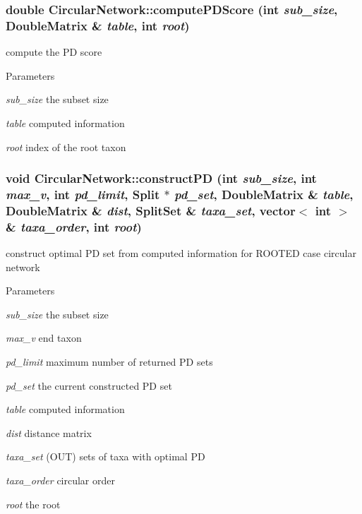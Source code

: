 \hypertarget{classCircularNetwork_a948222663b8ba7352ef09d037814e25b}{
\subsubsection[{computePDScore}]{\setlength{\rightskip}{0pt plus 5cm}double CircularNetwork::computePDScore (int {\em sub\_\-size}, \/  DoubleMatrix \& {\em table}, \/  int {\em root})}}
\label{classCircularNetwork_a948222663b8ba7352ef09d037814e25b}
compute the PD score 
\begin{DoxyParams}{Parameters}
\item[{\em sub\_\-size}]the subset size \item[{\em table}]computed information \item[{\em root}]index of the root taxon \end{DoxyParams}
\hypertarget{classCircularNetwork_ad4b30f917950be55c1c2b2c5bc66dc3a}{
\subsubsection[{constructPD}]{\setlength{\rightskip}{0pt plus 5cm}void CircularNetwork::constructPD (int {\em sub\_\-size}, \/  int {\em max\_\-v}, \/  int {\em pd\_\-limit}, \/  {\bf Split} $\ast$ {\em pd\_\-set}, \/  DoubleMatrix \& {\em table}, \/  DoubleMatrix \& {\em dist}, \/  {\bf SplitSet} \& {\em taxa\_\-set}, \/  vector$<$ int $>$ \& {\em taxa\_\-order}, \/  int {\em root})}}
\label{classCircularNetwork_ad4b30f917950be55c1c2b2c5bc66dc3a}
construct optimal PD set from computed information for ROOTED case circular network 
\begin{DoxyParams}{Parameters}
\item[{\em sub\_\-size}]the subset size \item[{\em max\_\-v}]end taxon \item[{\em pd\_\-limit}]maximum number of returned PD sets \item[{\em pd\_\-set}]the current constructed PD set \item[{\em table}]computed information \item[{\em dist}]distance matrix \item[{\em taxa\_\-set}](OUT) sets of taxa with optimal PD \item[{\em taxa\_\-order}]circular order \item[{\em root}]the root \end{DoxyParams}
